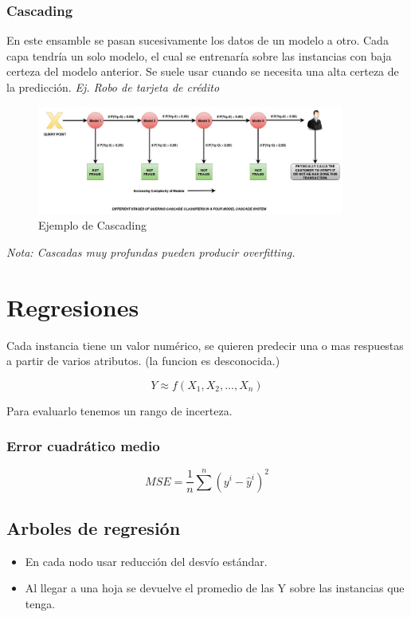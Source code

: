 \documentclass[titlepage,a4paper]{article}
\begin{document}
\subsubsection{Cascading}
En este ensamble se pasan sucesivamente los datos de un modelo a otro. Cada capa tendría un solo modelo, el cual se entrenaría sobre las instancias con baja certeza del modelo anterior. Se suele usar cuando se necesita una alta certeza de la predicción. \textit{Ej. Robo de tarjeta de crédito}


\begin{figure}[!htb]
    \centering
    \includegraphics[width=0.9\textwidth]{imagenesResumen/Cascading.jpeg}
    \caption{Ejemplo de Cascading}
\end{figure}


\textit{Nota: Cascadas muy profundas pueden producir overfitting.}

\newpage


\section{Regresiones}

Cada instancia tiene un valor numérico, se quieren predecir una o mas respuestas a partir de varios atributos.  (la funcion es desconocida.)

\begin{equation}
    Y \approx f(X_1, X_2,..., X_n)
\end{equation}


Para evaluarlo tenemos un rango de incerteza.

\subsubsection*{Error cuadrático medio}
\begin{equation}
    MSE = \frac{1}{n} \sum^{n} (y^{i}-\hat{y}^{i})^{2}
\end{equation}

\subsection{Arboles de regresión}
\begin{itemize}
    \item En cada nodo usar reducción del desvío estándar.
    \item Al llegar a una hoja se devuelve el promedio de las Y sobre las instancias que tenga.
\end{itemize}
\end{document}
